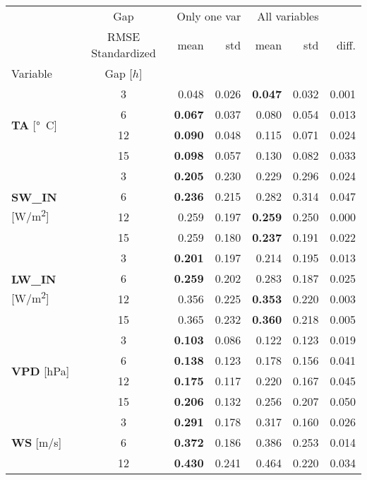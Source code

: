 \begin{table}
\centering
\begin{tabular}{p{2.1cm}c|rr|rr|r}
\toprule
 & Gap & \multicolumn{2}{r}{Only one var} & \multicolumn{2}{r}{All variables} &  \\
 & RMSE Standardized & mean & std & mean & std & diff. \\
Variable & Gap [$h$] &  &  &  &  &  \\
\midrule
\multirow[c]{4}{*}{\parbox{2.1cm}{\textbf{TA} [\si{°C}]}} & 3 & 0.048 & 0.026 & \bfseries 0.047 & 0.032 & 0.001 \\
 & 6 & \bfseries 0.067 & 0.037 & 0.080 & 0.054 & 0.013 \\
 & 12 & \bfseries 0.090 & 0.048 & 0.115 & 0.071 & 0.024 \\
 & 15 & \bfseries 0.098 & 0.057 & 0.130 & 0.082 & 0.033 \\
\cline{1-7}
\multirow[c]{4}{*}{\parbox{2.1cm}{\textbf{SW\_IN} [\si{W/m^2}]}} & 3 & \bfseries 0.205 & 0.230 & 0.229 & 0.296 & 0.024 \\
 & 6 & \bfseries 0.236 & 0.215 & 0.282 & 0.314 & 0.047 \\
 & 12 & 0.259 & 0.197 & \bfseries 0.259 & 0.250 & 0.000 \\
 & 15 & 0.259 & 0.180 & \bfseries 0.237 & 0.191 & 0.022 \\
\cline{1-7}
\multirow[c]{4}{*}{\parbox{2.1cm}{\textbf{LW\_IN} [\si{W/m^2}]}} & 3 & \bfseries 0.201 & 0.197 & 0.214 & 0.195 & 0.013 \\
 & 6 & \bfseries 0.259 & 0.202 & 0.283 & 0.187 & 0.025 \\
 & 12 & 0.356 & 0.225 & \bfseries 0.353 & 0.220 & 0.003 \\
 & 15 & 0.365 & 0.232 & \bfseries 0.360 & 0.218 & 0.005 \\
\cline{1-7}
\multirow[c]{4}{*}{\parbox{2.1cm}{\textbf{VPD} [\si{hPa}]}} & 3 & \bfseries 0.103 & 0.086 & 0.122 & 0.123 & 0.019 \\
 & 6 & \bfseries 0.138 & 0.123 & 0.178 & 0.156 & 0.041 \\
 & 12 & \bfseries 0.175 & 0.117 & 0.220 & 0.167 & 0.045 \\
 & 15 & \bfseries 0.206 & 0.132 & 0.256 & 0.207 & 0.050 \\
\cline{1-7}
\multirow[c]{4}{*}{\parbox{2.1cm}{\textbf{WS} [\si{m/s}]}} & 3 & \bfseries 0.291 & 0.178 & 0.317 & 0.160 & 0.026 \\
 & 6 & \bfseries 0.372 & 0.186 & 0.386 & 0.253 & 0.014 \\
 & 12 & \bfseries 0.430 & 0.241 & 0.464 & 0.220 & 0.034 \\

\end{tabular}
\end{table}
